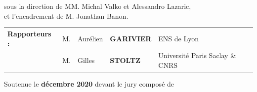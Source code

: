 \documentclass[12pt,fleqn]{book} %
\begin{document}
{\begin{center}
{\sffamily
sous la direction de MM. Michal Valko et Alessandro Lazaric, \\ et l'encadrement de M. Jonathan Banon.
}
\end{center}



\vspace{1.cm}

{\sffamily

\begin{tabular}{lllll}
{\bf\sffamily Rapporteurs :} 
& {M.}   & Aur\' elien & {\bf\sffamily GARIVIER} & ENS de Lyon \\
& {M.}   & Gilles & {\bf\sffamily STOLTZ}     & Universit\'e Paris Saclay \& CNRS \\
\end{tabular}

{\sffamily\vspace{1.cm} Soutenue le {\bf{} décembre 2020} devant le jury
compos{\'e} de}
}
\bigskip

\bigskip

}
\end{document}
